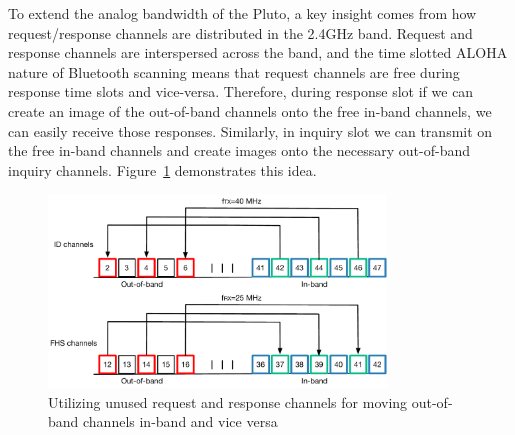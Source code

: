To extend the analog bandwidth of the Pluto, a key insight comes from how request/response channels are distributed in the 2.4GHz band. 
%
Request and response channels are interspersed across the band, and the time slotted ALOHA nature of Bluetooth scanning means that request channels are free during response time slots and vice-versa.
%
Therefore,
during response slot if we can create an image of the out-of-band
channels onto the free in-band channels, we can easily receive those
responses. 
%
Similarly, in inquiry slot we can transmit on the free
in-band channels and create images onto the necessary out-of-band
inquiry channels.
%
Figure~\ref{fig:hyperscanner:unusedchans} demonstrates this idea.

\begin{figure}[h!]
    \centering
    \captionsetup{justification=centering}
    \includegraphics[width=0.8\textwidth]{hyperscanner/figs/switch_channels.pdf}
    \caption{Utilizing unused request and response channels for moving out-of-band channels in-band and vice versa}
    \label{fig:hyperscanner:unusedchans}
\end{figure}

